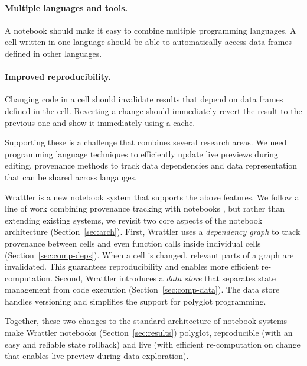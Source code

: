 \documentclass[sigplan]{acmart}\settopmatter{printfolios=true,printccs=false,printacmref=false}
\begin{document}
\vspace{-0.3em}
\paragraph{Multiple languages and tools.} 
A notebook should make it easy to combine multiple programming languages. A cell written in one
language should be able to automatically access data frames defined in other languages.

\vspace{-0.3em}
\paragraph{Improved reproducibility.} 
Changing code in a cell should invalidate results that depend on data frames defined in 
the cell. Reverting a change should immediately revert the result to the previous one
and show it immediately using a cache.

\vspace{0.5em}
\noindent
Supporting these is a challenge that combines several research areas. We need programming 
language techniques to efficiently update live previews during editing, provenance methods to 
track data dependencies and data representation that can be shared across langauges.

Wrattler is a new notebook system that supports the above features. We follow a line of work combining 
provenance tracking with notebooks \cite{noworkflow,dataflow}, but rather than extending existing 
systems, we revisit two core aspects of the notebook architecture (Section~\ref{sec:arch}). 
First, Wrattler uses a \emph{dependency graph} to track provenance between cells and even function calls 
inside individual cells (Section~\ref{sec:comp-deps}). When a cell is changed, relevant parts of a graph
are invalidated. This guarantees reproducibility and enables more efficient re-computation.
Second, Wrattler introduces a \emph{data store} that separates state management from code execution 
(Section~\ref{sec:comp-data}). The data store handles versioning and simplifies the support for polyglot programming.

Together, these two changes to the standard architecture of notebook systems make Wrattler notebooks
(Section~\ref{sec:results}) polyglot, reproducible (with an easy and reliable state rollback) and live 
(with efficient re-computation on change that enables live preview during data exploration).
\end{document}
